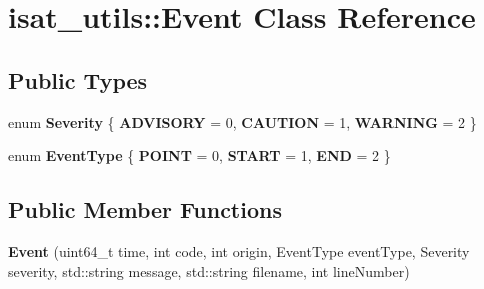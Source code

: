 \hypertarget{classisat__utils_1_1_event}{}\section{isat\+\_\+utils\+:\+:Event Class Reference}
\label{classisat__utils_1_1_event}
\subsection*{Public Types}
\begin{DoxyCompactItemize}
\item 
enum {\bfseries Severity} \{ {\bfseries A\+D\+V\+I\+S\+O\+RY} = 0, 
{\bfseries C\+A\+U\+T\+I\+ON} = 1, 
{\bfseries W\+A\+R\+N\+I\+NG} = 2
 \}\hypertarget{classisat__utils_1_1_event_a3721f628cedc1a48b57aff46a1b8d358}{}\label{classisat__utils_1_1_event_a3721f628cedc1a48b57aff46a1b8d358}

\item 
enum {\bfseries Event\+Type} \{ {\bfseries P\+O\+I\+NT} = 0, 
{\bfseries S\+T\+A\+RT} = 1, 
{\bfseries E\+ND} = 2
 \}\hypertarget{classisat__utils_1_1_event_a73bb205ee5b3984b2b426fa371898934}{}\label{classisat__utils_1_1_event_a73bb205ee5b3984b2b426fa371898934}

\end{DoxyCompactItemize}
\subsection*{Public Member Functions}
\begin{DoxyCompactItemize}
\item 
{\bfseries Event} (uint64\+\_\+t time, int code, int origin, Event\+Type event\+Type, Severity severity, std\+::string message, std\+::string filename, int line\+Number)\hypertarget{classisat__utils_1_1_event_adc3147f2bf23103e97ce625c81da22c7}{}\label{classisat__utils_1_1_event_adc3147f2bf23103e97ce625c81da22c7}

\end{DoxyCompactItemize}
